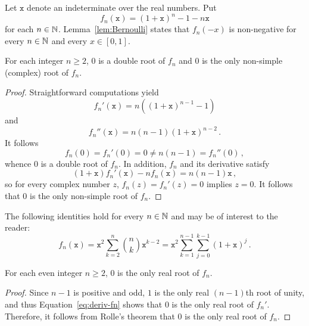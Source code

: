 
\newcommand{\ttx}{\mathtt{x}}

Let  $\ttx$ denote an indeterminate over the real numbers.
Put
$$
f_n(\ttx) = {(1 + \ttx)}^n - 1 - n \ttx 
$$
for each $n \in \mathbb{N}$.
Lemma~\ref{lem:Bernoulli} states that $f_n(- x)$ is non-negative for every $n \in \mathbb{N}$ and every $x \in [0, 1]$.

\begin{lemma} \label{lem:root-mult}
  For each integer $n \ge 2$,
  $0$ is a double root of $f_n$ and $0$ is the only non-simple (complex) root of $f_n$.
\end{lemma}

\begin{proof}
  Straightforward computations yield
  \begin{equation} \label{eq:deriv-fn} 
  f_n'(\ttx)  = n \left( {(1 + \ttx)}^{n - 1} -  1 \right) 
  \end{equation}
  and
  $$
  f_n''(\ttx)  = n (n - 1) {(1 + \ttx)}^{n - 2} \,.
  $$
  It follows
  $$
  f_n(0) = f_n'(0) = 0 \ne n (n - 1) = f_n''(0) \, ,
  $$
  whence $0$ is a double root of $f_n$.
  In addition, $f_n$ and its derivative satisfy 
   $$
   (1 + \ttx) f_n'(\ttx) - n f_n(\ttx) = n (n - 1) \ttx \, ,
   $$
   so for every complex number $z$, $f_n(z) = f_n'(z) = 0$ implies $z = 0$.
   It follows that $0$ is the only non-simple root of $f_n$.
 \end{proof}

 The following identities hold for every $n \in \mathbb{N}$ and may be of interest to the reader:
 $$
 f_n (\ttx)
 = \ttx^2 \sum_{k = 2}^n \binom{n}{k} \ttx^{k - 2}
 = \ttx^2 \sum_{k = 1}^{n - 1}  \sum_{j = 0}^{k - 1} {(1 + \ttx)}^j \, .  
 $$


\begin{lemma} \label{lem:even-one-root}
  For each even integer $n \ge 2$,
  $0$ is the only real root of $f_n$.
 \end{lemma} 

 \begin{proof}
   Since $n - 1$ is positive and odd,
   $1$ is the only real $(n - 1)$th root of unity, 
   and thus Equation~\eqref{eq:deriv-fn} shows that $0$ is the only real root of $f_n'$.
Therefore, it follows from Rolle's theorem that $0$ is the only real root of $f_n$.
 \end{proof} 

